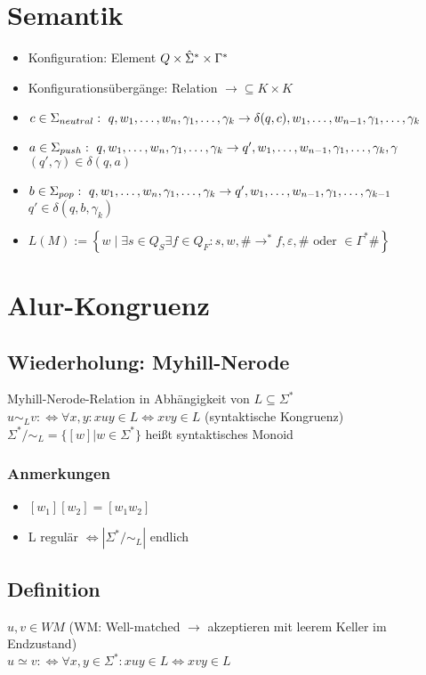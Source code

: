 \section{Semantik}
    \begin{itemize}
        \item Konfiguration: Element $Q\times\hat{\Sigma}^*\times \Gamma^*$
        \item Konfigurationsübergänge: Relation $\rightarrow \subseteq K\times K$
        \item $c\in\Sigmaneut:\ q,w_1,\dots,w_n,\gamma_1,\dots,\gamma_k\rightarrow \delta(q,c),w_1,\dots,w_{n-1},\gamma_1,\dots,\gamma_k$
        \item $a\in\Sigmapush:\ q,w_1,\dots,w_n,\gamma_1,\dots,\gamma_k\rightarrow q',w_1,\dots,w_{n-1},\gamma_1,\dots,\gamma_k,\gamma$
        \subitem $(q',\gamma)\in\delta(q,a)$
        \item $b\in\Sigmapop:\ q,w_1,\dots,w_n,\gamma_1,\dots,\gamma_k\rightarrow q',w_1,\dots,w_{n-1},\gamma_1,\dots,\gamma_{k-1}$
        \subitem $q'\in\delta(q,b,\gamma_k)$
        \item $L(M):=\left\{w\mid\exists s\in Q_S\exists f\in Q_F: s,w,\# \rightarrow^* f,\varepsilon,\# \text{ oder } \in\Gamma^*\#\right\}$
    \end{itemize}
\section{Alur-Kongruenz}
\subsection{Wiederholung: Myhill-Nerode}
    Myhill-Nerode-Relation in Abhängigkeit von $L\subseteq \Sigma^*$\\
    $u\sim_L v :\Leftrightarrow \forall x,y: xuy\in L \Leftrightarrow xvy\in L$ (syntaktische Kongruenz)\\
    $\Sigma^*/\sim_L=\{[w]|w\in\Sigma^*\}$ heißt syntaktisches Monoid
    \subsubsection{Anmerkungen}
        \begin{itemize}
            \item $[w_1][w_2]=[w_1w_2]$
            \item L regulär $\Leftrightarrow |\Sigma^*/\sim_L|$ endlich
        \end{itemize}
\subsection{Definition}
    $u,v\in WM$ (WM: Well-matched $\rightarrow$ akzeptieren mit leerem Keller im Endzustand)\\
    $u\simeq v :\Leftrightarrow \forall x,y\in\Sigma^*: xuy\in L\Leftrightarrow xvy\in L$

